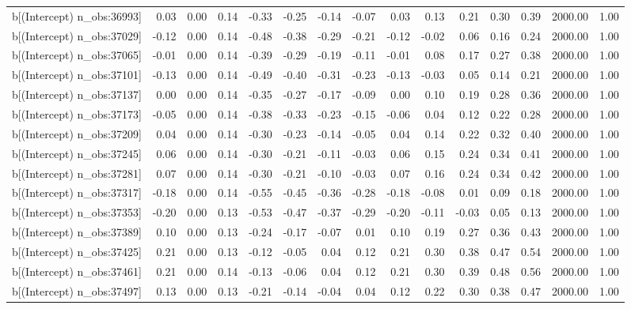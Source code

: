 \begin{table}[ht]
\begin{tabular}{rrrrrrrrrrrrrrr}
  b[(Intercept) n\_obs:36993] & 0.03 & 0.00 & 0.14 & -0.33 & -0.25 & -0.14 & -0.07 & 0.03 & 0.13 & 0.21 & 0.30 & 0.39 & 2000.00 & 1.00 \\ 
  b[(Intercept) n\_obs:37029] & -0.12 & 0.00 & 0.14 & -0.48 & -0.38 & -0.29 & -0.21 & -0.12 & -0.02 & 0.06 & 0.16 & 0.24 & 2000.00 & 1.00 \\ 
  b[(Intercept) n\_obs:37065] & -0.01 & 0.00 & 0.14 & -0.39 & -0.29 & -0.19 & -0.11 & -0.01 & 0.08 & 0.17 & 0.27 & 0.38 & 2000.00 & 1.00 \\ 
  b[(Intercept) n\_obs:37101] & -0.13 & 0.00 & 0.14 & -0.49 & -0.40 & -0.31 & -0.23 & -0.13 & -0.03 & 0.05 & 0.14 & 0.21 & 2000.00 & 1.00 \\ 
  b[(Intercept) n\_obs:37137] & 0.00 & 0.00 & 0.14 & -0.35 & -0.27 & -0.17 & -0.09 & 0.00 & 0.10 & 0.19 & 0.28 & 0.36 & 2000.00 & 1.00 \\ 
  b[(Intercept) n\_obs:37173] & -0.05 & 0.00 & 0.14 & -0.38 & -0.33 & -0.23 & -0.15 & -0.06 & 0.04 & 0.12 & 0.22 & 0.28 & 2000.00 & 1.00 \\ 
  b[(Intercept) n\_obs:37209] & 0.04 & 0.00 & 0.14 & -0.30 & -0.23 & -0.14 & -0.05 & 0.04 & 0.14 & 0.22 & 0.32 & 0.40 & 2000.00 & 1.00 \\ 
  b[(Intercept) n\_obs:37245] & 0.06 & 0.00 & 0.14 & -0.30 & -0.21 & -0.11 & -0.03 & 0.06 & 0.15 & 0.24 & 0.34 & 0.41 & 2000.00 & 1.00 \\ 
  b[(Intercept) n\_obs:37281] & 0.07 & 0.00 & 0.14 & -0.30 & -0.21 & -0.10 & -0.03 & 0.07 & 0.16 & 0.24 & 0.34 & 0.42 & 2000.00 & 1.00 \\ 
  b[(Intercept) n\_obs:37317] & -0.18 & 0.00 & 0.14 & -0.55 & -0.45 & -0.36 & -0.28 & -0.18 & -0.08 & 0.01 & 0.09 & 0.18 & 2000.00 & 1.00 \\ 
  b[(Intercept) n\_obs:37353] & -0.20 & 0.00 & 0.13 & -0.53 & -0.47 & -0.37 & -0.29 & -0.20 & -0.11 & -0.03 & 0.05 & 0.13 & 2000.00 & 1.00 \\ 
  b[(Intercept) n\_obs:37389] & 0.10 & 0.00 & 0.13 & -0.24 & -0.17 & -0.07 & 0.01 & 0.10 & 0.19 & 0.27 & 0.36 & 0.43 & 2000.00 & 1.00 \\ 
  b[(Intercept) n\_obs:37425] & 0.21 & 0.00 & 0.13 & -0.12 & -0.05 & 0.04 & 0.12 & 0.21 & 0.30 & 0.38 & 0.47 & 0.54 & 2000.00 & 1.00 \\ 
  b[(Intercept) n\_obs:37461] & 0.21 & 0.00 & 0.14 & -0.13 & -0.06 & 0.04 & 0.12 & 0.21 & 0.30 & 0.39 & 0.48 & 0.56 & 2000.00 & 1.00 \\ 
  b[(Intercept) n\_obs:37497] & 0.13 & 0.00 & 0.13 & -0.21 & -0.14 & -0.04 & 0.04 & 0.12 & 0.22 & 0.30 & 0.38 & 0.47 & 2000.00 & 1.00 \\ 

\end{tabular}
\end{table}
